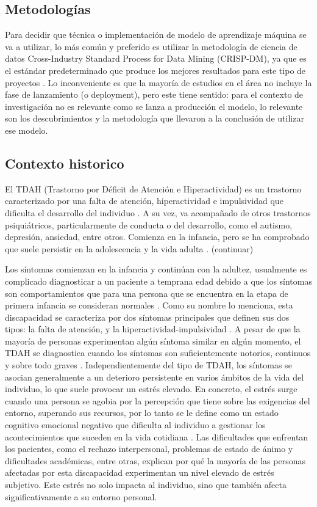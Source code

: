 \documentclass[10pt,journal,compsoc]{IEEEtran}
\begin{document}
\subsection{Metodologías}
Para decidir que técnica o implementación de modelo de aprendizaje máquina se va a utilizar, lo más común y preferido es utilizar la metodología de ciencia de datos Cross-Industry Standard Process for Data Mining (CRISP-DM), ya que es el estándar predeterminado que produce los mejores resultados para este tipo de proyectos \cite{schroer-2021}. Lo inconveniente es que la mayoría de estudios en el área no incluye la fase de lanzamiento (o deployment), pero este tiene sentido: para el contexto de investigación no es relevante como se lanza a producción el modelo, lo relevante son los descubrimientos y la metodología que llevaron a la conclusión de utilizar ese modelo.

\subsection{Contexto historico}
El TDAH (Trastorno por Déficit de Atención e Hiperactividad) es un trastorno caracterizado por una falta de atención, hiperactividad e impulsividad que dificulta el desarrollo del individuo \cite{thapar2008overview}. A su vez, va acompañado de otros trastornos psiquiátricos, particularmente de conducta o del desarrollo, como el autismo, depresión, ansiedad, entre otros. Comienza en la infancia, pero se ha comprobado que suele persistir en la adolescencia y la vida adulta \cite{combs2015perceived}. (continuar)

Los síntomas comienzan en la infancia y continúan con la adultez, usualmente es complicado diagnosticar a un paciente a temprana edad debido a que los síntomas son comportamientos que para una persona que se encuentra en la etapa de primera infancia se consideran normales \cite{national-institute-of-mental-health-no-date}. Como su nombre lo menciona, esta discapacidad se caracteriza por dos síntomas principales que definen sus dos tipos: la falta de atención, y la hiperactividad-impulsividad \cite{combs2015perceived}. A pesar de que la mayoría de personas experimentan algún síntoma similar en algún momento, el TDAH se diagnostica cuando los síntomas son suficientemente notorios, continuos y sobre todo graves \cite{chen-2023}. Independientemente del tipo de TDAH, los síntomas se asocian generalmente a un deterioro persistente en varios ámbitos de la vida del individuo, lo que suele provocar un estrés elevado. En concreto, el estrés surge cuando una persona se agobia por la percepción que tiene sobre las exigencias del entorno, superando sus recursos, por lo tanto se le define como un estado cognitivo emocional negativo que dificulta al individuo a gestionar los acontecimientos que suceden en la vida cotidiana \cite{combs2015perceived}. Las dificultades que enfrentan los pacientes, como el rechazo interpersonal, problemas de estado de ánimo y dificultades académicas, entre otras, explican por qué la mayoría de las personas afectadas por esta discapacidad experimentan un nivel elevado de estrés subjetivo. Este estrés no solo impacta al individuo, sino que también afecta significativamente a su entorno personal.
\end{document}

